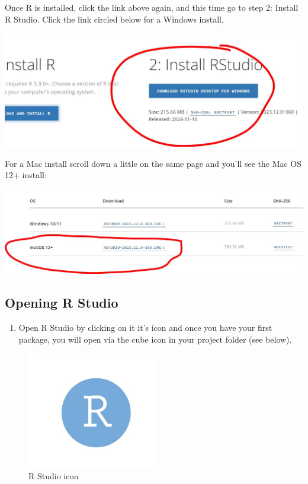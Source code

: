 \documentclass[
]{html}
\providecommand{\tightlist}{%
  \setlength{\itemsep}{0pt}\setlength{\parskip}{0pt}}
\theoremstyle{definition}
\theoremstyle{definition}
\theoremstyle{definition}
\theoremstyle{definition}
\theoremstyle{remark}
\begin{document}
Once R is installed, click the link above again, and this time go to step 2: Install R Studio. Click the link circled below for a Windows install,

\href{https://posit.co/download/rstudio-desktop/}{\includegraphics{images/Rstudioinstall2.JPG}}

For a Mac install scroll down a little on the same page and you'll see the Mac OS 12+ install:

\href{https://posit.co/download/rstudio-desktop/}{\includegraphics{images/macinstall.JPG}}

\hypertarget{opening-r-studio}{%
\subsection{Opening R Studio}\label{opening-r-studio}}

\begin{enumerate}
\def\labelenumi{\arabic{enumi}.}
\tightlist
\item
  Open R Studio by clicking on it it's icon and once you have your first package, you will open via the cube icon in your project folder (see below).
\end{enumerate}

\begin{figure}
\centering
\includegraphics[width=2.27083in,height=\textheight]{images/Rstudio_icon.JPG}
\caption{R Studio icon}
\end{figure}
\end{document}
